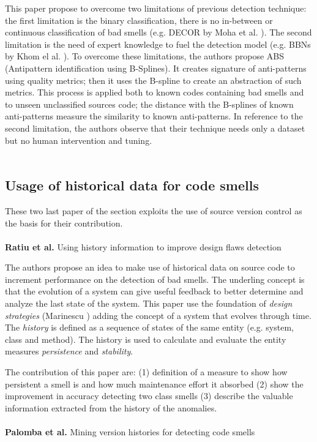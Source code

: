 This paper propose to overcome two limitations of previous detection technique: the first limitation is the binary classification, there is no in-between or continuous classification of bad smells (e.g. DECOR by Moha et al. \cite{moha2009decor}).
The second limitation is the need of expert knowledge to fuel the detection model (e.g. BBNs by Khom el al. \cite{khomh2009bayesian}).
To overcome these limitations, the authors propose ABS (Antipattern identification using B-Splines). It creates signature of anti-patterns using quality metrics; then it uses the B-spline to create an abstraction of such metrics. This process is applied both to known codes containing bad smells and to unseen unclassified sources code; the distance with the B-splines of known anti-patterns measure the similarity to known anti-patterns.
In reference to the second limitation, the authors observe that their technique needs only a dataset but no human intervention and tuning.
\\
\\
\subsection{Usage of historical data for code smells } 
These two last paper of the section exploits the use of source version control as the basis for their contribution.
\\
\\
\textbf{Ratiu et al.} \cite{rapu2004using} Using history information to improve design flaws detection

The authors propose an idea to make use of historical data on source code to increment performance on the detection of bad smells.
The underling concept is that the evolution of a system can give useful feedback to better determine and analyze the last state of the system.
This paper use the foundation of \emph{design strategies} (Marinescu \cite{marinescu2004detection} ) adding the concept of a system that evolves through time.
The \emph{history} is defined as a sequence of states of the same entity (e.g. system, class and method). The history is used to calculate and evaluate the entity measures \emph{persistence} and \emph{stability}.

The contribution of this paper are: (1) definition of a measure to show how persistent a smell is and how much maintenance effort it absorbed (2) show the improvement in accuracy detecting two class smells (3) describe the valuable information extracted from the history of the anomalies.
\\
\\
\textbf{Palomba et al.} \cite{palomba2014mining} Mining version histories for detecting code smells

